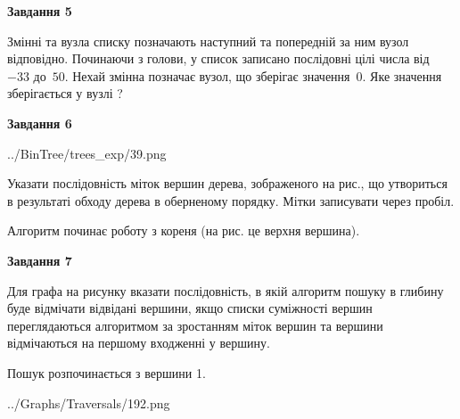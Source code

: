 \documentclass[12pt, ukrainian]{article}
\begin{document}
{\begin {large}
{\begin {center}\textbf{Завдання 5}\end {center}}\par
Змінні  та  вузла списку позначають наступний та попередній за ним вузол відповідно. Починаючи з голови, у список записано послідовні цілі числа від~$-33$ до~$50$. Нехай змінна  позначає вузол, що зберігає значення~$0$.
Яке значення зберігається у вузлі  ?\par
\newpage

{\begin {center}\textbf{Завдання 6}\end {center}}\par

\begin{center}
	{../BinTree/trees_exp/39.png}
\end{center}
Указати послідовність міток вершин дерева, зображеного на рис., що утвориться в результаті обходу дерева в оберненому порядку. Мітки записувати через пробіл.\par Алгоритм починає роботу з кореня (на рис. це верхня вершина).\par
\newpage

{\begin {center}\textbf{Завдання 7}\end {center}}\par
Для графа на рисунку вказати послідовність, в якій алгоритм пошуку в глибину буде відмічати відвідані вершини, якщо списки суміжності вершин переглядаються алгоритмом за зростанням міток вершин та вершини відмічаються на першому вход\-женні у вершину.\par
Пошук розпочинається з вершини 1.\par

\begin{center}
	{../Graphs/Traversals/192.png}
\end{center}\par
\newpage


\end{large}}
\end{document}

